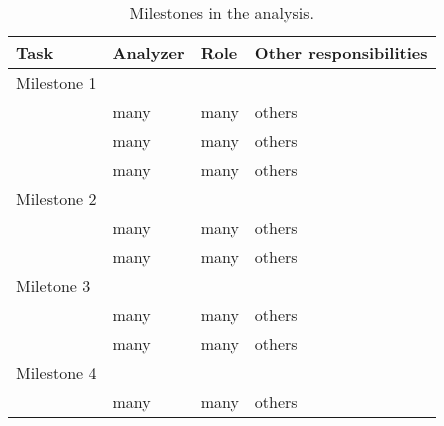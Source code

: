 \begin{table}[htb]
\caption{Milestones in the analysis.}
\begin{tabular}{llll}\hline
Task & Analyzer & Role & Other responsibilities\\\hline
Milestone 1\\
\color{red}{Generation dijet invariant mass pseudo-distribution} & many & many & others\\
\color{red}{Perform S+B fitting of pseudo-data}                  & many & many & others\\
\color{green}{Unblinding}                                        &
many & many & others\\
\hline
Milestone 2\\
\color{red}{Perform S+B fitting of data}                         & many & many & others\\
\color{green}{Decision to claim discover or set limits}          & many & many & others\\
\hline
Miletone 3\\
\color{red}{Set model-independent limits}                        & many & many & others\\
\color{red}{Set model-dependent limits}                          & many & many & others\\
\hline
Milestone 4\\
\color{green}{Write paper}                                       & many & many & others\\
\hline
\end{tabular}
\end{table}
